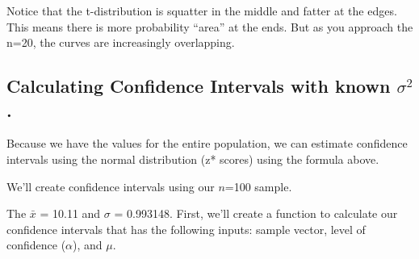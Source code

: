 \documentclass{tufte-handout}\usepackage[]{graphicx}\usepackage[]{color}
\begin{document}
Notice that the t-distribution is squatter in the middle and fatter at the edges. This means there is more probability ``area'' at the ends. But as you approach the n=20, the curves are increasingly overlapping.

\subsection{Calculating Confidence Intervals with known $\sigma^2$.}

Because we have the values for the entire population, we can estimate confidence intervals using the normal distribution (z* scores) using the formula above. 

We'll create confidence intervals using our $n$=100 sample. 

The $\bar{x}$ = 10.11 and $\sigma$ = 0.993148. First, we'll create a function to calculate our confidence intervals that has the following inputs: sample vector, level of confidence ($\alpha$), and $\mu$.
\end{document}
